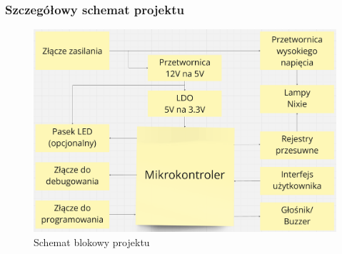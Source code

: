 \documentclass[../main.tex]{subfiles}
\begin{document}
\subsubsection{Szczegółowy schemat projektu}
\begin{figure}[H]
    \centering
    \includegraphics[width=1\textwidth]{schemat_szcz.png}
    \caption{Schemat blokowy projektu}
    \label{fig:schemat_projektu}
\end{figure}
\end{document}
